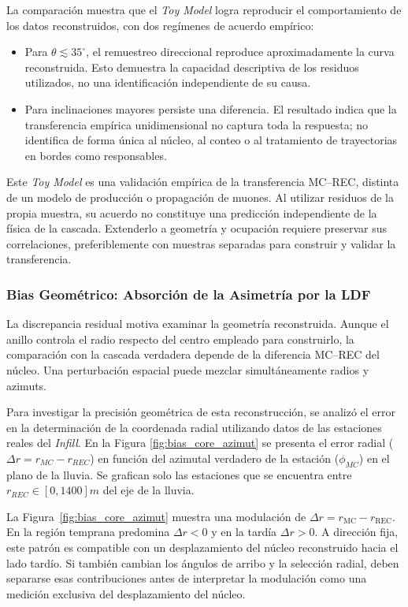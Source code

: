 La comparación muestra que el \textit{Toy Model} logra reproducir el comportamiento de los datos reconstruidos, con dos regímenes de acuerdo empírico:

\begin{itemize}
\item Para $\theta\lesssim35^\circ$, el remuestreo direccional reproduce aproximadamente la curva reconstruida. Esto demuestra la capacidad descriptiva de los residuos utilizados, no una identificación independiente de su causa.
\item Para inclinaciones mayores persiste una diferencia. El resultado indica que la transferencia empírica unidimensional no captura toda la respuesta; no identifica de forma única al núcleo, al conteo o al tratamiento de trayectorias en bordes como responsables.
\end{itemize}

Este \textit{Toy Model} es una validación empírica de la transferencia MC--REC, distinta de un modelo de producción o propagación de muones. Al utilizar residuos de la propia muestra, su acuerdo no constituye una predicción independiente de la física de la cascada. Extenderlo a geometría y ocupación requiere preservar sus correlaciones, preferiblemente con muestras separadas para construir y validar la transferencia.

\subsubsection{Bias Geométrico: Absorción de la Asimetría por la LDF}

La discrepancia residual motiva examinar la geometría reconstruida. Aunque el anillo controla el radio respecto del centro empleado para construirlo, la comparación con la cascada verdadera depende de la diferencia MC--REC del núcleo. Una perturbación espacial puede mezclar simultáneamente radios y azimuts.

Para investigar la precisión geométrica de esta reconstrucción, se analizó el error en la determinación de la coordenada radial utilizando datos de las estaciones reales del \textit{Infill}. En la Figura \ref{fig:bias_core_azimut} se presenta el error radial ($\Delta r = r_{MC} - r_{REC}$) en función del azimutal verdadero de la estación ($\phi_{MC}$) en el plano de la lluvia. Se grafican solo las estaciones que se encuentra entre $r_{REC} \in [0,1400]m$ del eje de la lluvia.

La Figura~\ref{fig:bias_core_azimut} muestra una modulación de $\Delta r=r_{\mathrm{MC}}-r_{\mathrm{REC}}$. En la región temprana predomina $\Delta r<0$ y en la tardía $\Delta r>0$. A dirección fija, este patrón es compatible con un desplazamiento del núcleo reconstruido hacia el lado tardío. Si también cambian los ángulos de arribo y la selección radial, deben separarse esas contribuciones antes de interpretar la modulación como una medición exclusiva del desplazamiento del núcleo.

